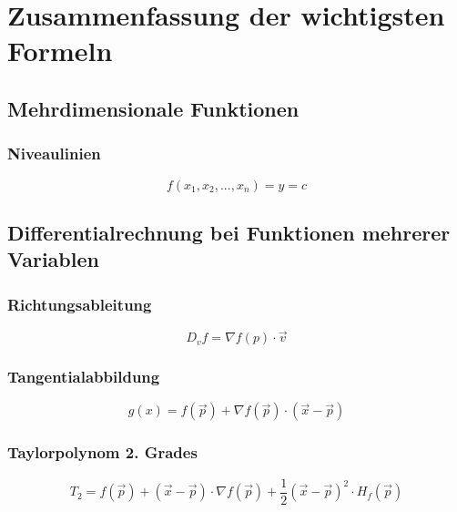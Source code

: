 \section{Zusammenfassung der wichtigsten Formeln} %
\label{sec:zusammenfassung_der_wichtigsten_formeln}

\subsection{Mehrdimensionale Funktionen}
\label{sub:mehrdimensionale_funktionen}
\subsubsection{Niveaulinien} 
\label{ssub:niveaulinien}
\begin{equation}
	f(x_1,x_2,...,x_n) = y = c
\end{equation}	

\subsection{Differentialrechnung bei Funktionen mehrerer Variablen}
\label{sub:differentialrechnung_bei_funktionen_mehrerer_variablen}
\subsubsection{Richtungsableitung} 
\label{ssub:richtungsableitung}
\begin{equation}
	D_vf = \nabla f(p) \cdot \overrightarrow{v}
\end{equation}	
\subsubsection{Tangentialabbildung}
\label{ssub:tangentialabbildung}
\begin{equation}
	g(x) = f(\overrightarrow{p}) + \nabla f(\overrightarrow{p})\cdot(\overrightarrow{x}-\overrightarrow{p})
\end{equation}	
\subsubsection{Taylorpolynom 2. Grades}
\label{ssub:taylorpolynom_2_grades}
\begin{equation}
	T_2 = f(\overrightarrow{p}) + (\overrightarrow{x}-\overrightarrow{p}) \cdot \nabla f(\overrightarrow{p})+\frac{1}{2}
	(\overrightarrow{x}-\overrightarrow{p})^2 \cdot H_f(\overrightarrow{p})
\end{equation}
